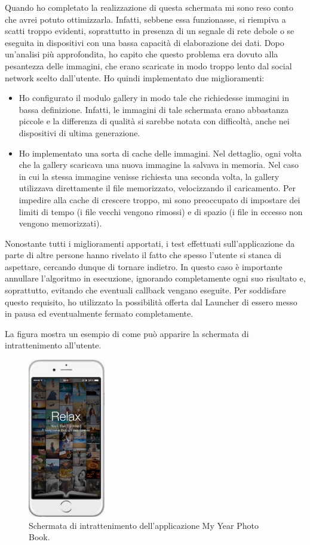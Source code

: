 				Quando ho completato la realizzazione di questa schermata mi sono reso conto che avrei potuto ottimizzarla. Infatti,
				sebbene essa funzionasse, si riempiva a scatti troppo evidenti, soprattutto in presenza di un segnale di rete
				debole o se eseguita in dispositivi con una bassa capacità di elaborazione dei dati. Dopo un'analisi più
				approfondita, ho capito che questo problema era dovuto alla pesantezza delle immagini, che erano scaricate in modo
				troppo lento dal social network scelto dall'utente. Ho quindi implementato due miglioramenti:
				\begin{itemize}
					\item Ho configurato il modulo gallery in modo tale che richiedesse immagini in bassa definizione. Infatti,
					le immagini di tale schermata erano abbastanza piccole e la differenza di qualità si sarebbe notata con
					difficoltà, anche nei dispositivi di ultima generazione.
					\item Ho implementato una sorta di cache delle immagini. Nel dettaglio, ogni volta che la gallery scaricava
					una nuova immagine la salvava in memoria. Nel caso in cui la stessa immagine venisse richiesta una seconda
					volta, la gallery utilizzava direttamente il file memorizzato, velocizzando il caricamento. Per impedire alla
					cache di crescere troppo, mi sono preoccupato di impostare dei limiti di tempo (i file vecchi vengono rimossi)
					e di spazio (i file in eccesso non vengono memorizzati).
				\end{itemize}
				Nonostante tutti i miglioramenti apportati, i test effettuati sull'applicazione da parte di altre persone hanno
				rivelato il fatto che spesso l'utente si stanca di aspettare, cercando dunque di tornare indietro. In questo caso
				è importante annullare l'algoritmo in esecuzione, ignorando completamente ogni suo risultato e, soprattutto, evitando
				che eventuali callback vengano eseguite. Per soddisfare questo requisito, ho utilizzato la possibilità offerta dal
				Launcher di essero messo in pausa ed eventualmente fermato completamente.
				
				\noindent La figura mostra un esempio di come può apparire la schermata di intrattenimento all'utente.
				\begin{figure}[H]
					\centering
					\includegraphics[width=0.3\textwidth]{capitolo_3/immagini/schermata_di_intrattenimento.png}
					\caption{Schermata di intrattenimento dell'applicazione My Year Photo Book.}
				\end{figure}
